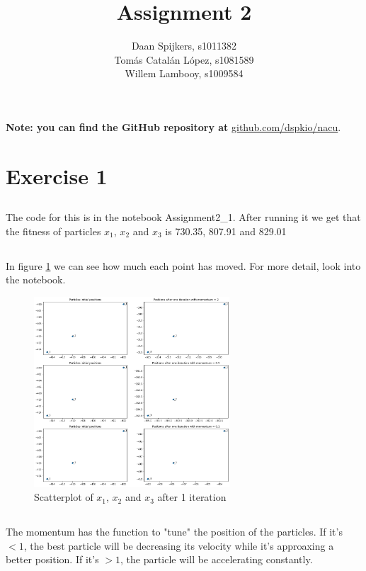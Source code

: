 \documentclass{scrartcl}
\title{Assignment 2}
\author{Daan Spijkers, s1011382\\ Tomás Catalán López, s1081589\\ Willem Lambooy, s1009584}
\begin{document}
\maketitle

\textbf{Note: you can find the GitHub repository at}
\url{github.com/dspkio/nacu}.

\section{Exercise 1}
\subsection{}
The code for this is in the notebook Assignment2\_1. After running it we get that the fitness of particles $x_1$, $x_2$ and $x_3$ is 730.35, 807.91 and 829.01

\subsection{}
In figure \ref{fig:1l} we can see how much each point has moved. For more detail, look into the notebook.

\begin{figure}[h!]
    \centering
    \includegraphics[width=0.65\textwidth]{images/1.png}
    \caption{Scatterplot of $x_1$, $x_2$ and $x_3$ after 1 iteration}
    \label{fig:1l}
\end{figure}

\subsection{}
The momentum has the function to "tune" the position of the particles. If it's $<1$, the best particle will be decreasing its velocity while it's approaxing a better position. If it's $>1$, the particle will be accelerating constantly.
\end{document}
